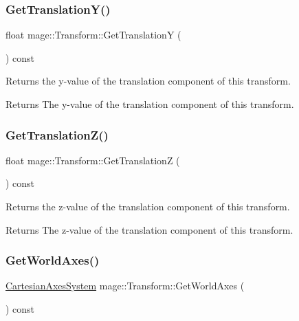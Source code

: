 \subsubsection{\texorpdfstring{Get\+Translation\+Y()}{GetTranslationY()}}
{\footnotesize\ttfamily float mage\+::\+Transform\+::\+Get\+TranslationY (\begin{DoxyParamCaption}{ }\end{DoxyParamCaption}) const}

Returns the y-\/value of the translation component of this transform.

\begin{DoxyReturn}{Returns}
The y-\/value of the translation component of this transform. 
\end{DoxyReturn}
\hypertarget{structmage_1_1_transform_a023ce9ea6afaaa80776b4d43957964bf}{}\label{structmage_1_1_transform_a023ce9ea6afaaa80776b4d43957964bf} 
\subsubsection{\texorpdfstring{Get\+Translation\+Z()}{GetTranslationZ()}}
{\footnotesize\ttfamily float mage\+::\+Transform\+::\+Get\+TranslationZ (\begin{DoxyParamCaption}{ }\end{DoxyParamCaption}) const}

Returns the z-\/value of the translation component of this transform.

\begin{DoxyReturn}{Returns}
The z-\/value of the translation component of this transform. 
\end{DoxyReturn}
\hypertarget{structmage_1_1_transform_a580a4f9fd987259da0cf0355ade7fb4b}{}\label{structmage_1_1_transform_a580a4f9fd987259da0cf0355ade7fb4b} 
\subsubsection{\texorpdfstring{Get\+World\+Axes()}{GetWorldAxes()}}
{\footnotesize\ttfamily \hyperlink{structmage_1_1_cartesian_axes_system}{Cartesian\+Axes\+System} mage\+::\+Transform\+::\+Get\+World\+Axes (\begin{DoxyParamCaption}{ }\end{DoxyParamCaption}) const}

